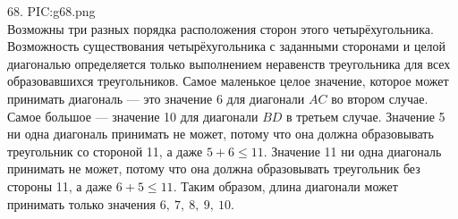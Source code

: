 68. {{PIC:g68.png}}\\
Возможны три разных порядка расположения сторон этого четырёхугольника. Возможность существования четырёхугольника с заданными сторонами и целой диагональю определяется только выполнением неравенств треугольника для всех образовавшихся треугольников. Самое маленькое целое значение, которое может принимать диагональ --- это значение 6 для диагонали $AC$ во втором случае. Самое большое --- значение 10 для диагонали $BD$ в третьем случае. Значение 5 ни одна диагональ принимать не может, потому что она должна образовывать треугольник со стороной 11, а даже $5+6\leqslant11.$ Значение 11 ни одна диагональ принимать не может, потому что она должна образовывать треугольник без стороны 11, а даже $6+5\leqslant11.$ Таким образом, длина диагонали может принимать только значения $6,\ 7,\ 8,\ 9,\ 10.$\\
